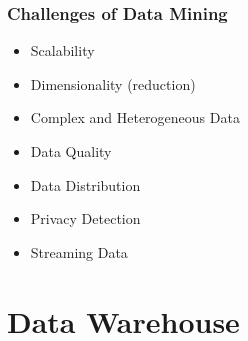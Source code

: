 \documentclass[10pt,a4paper]{article}
\begin{document}
\subsubsection{Challenges of Data Mining}
\begin{itemize}
	\item Scalability
	\item Dimensionality (reduction)
	\item Complex and Heterogeneous Data
	\item Data Quality
	\item Data Distribution
	\item Privacy Detection
	\item Streaming Data
\end{itemize}

\section{Data Warehouse}
\end{document}
